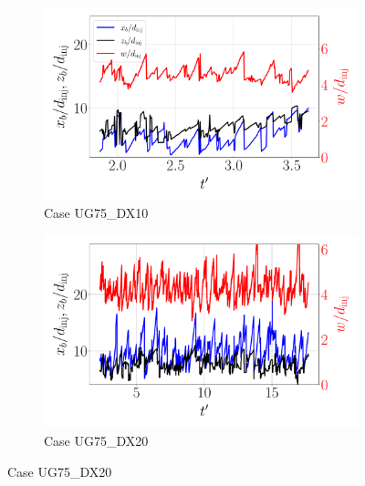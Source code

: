 
\begin{figure}[ht]
\flushleft
\begin{subfigure}[b]{0.45\textwidth}
	\centering
   \includegraphics[scale=0.25]{./part2_developments/figures_ch5_resolved_JICF/results_dense_core_modeling/instant_xb_zb_w_UG75_DX10}
   \vspace*{-0.25in}
   \caption{Case UG75\_DX10}
   \label{fig:instant_xb_zb_w_UG75_DX10} 
\end{subfigure}
\hfill
\begin{subfigure}[b]{0.45\textwidth}
	\centering
   \includegraphics[scale=0.25]{./part2_developments/figures_ch5_resolved_JICF/results_dense_core_modeling/instant_xb_zb_w_UG75_DX20}
   \vspace*{-0.25in}
   \caption{Case UG75\_DX20}
   \label{fig:instant_xb_zb_w_UG75_DX20}
\end{subfigure}


\end{figure}
